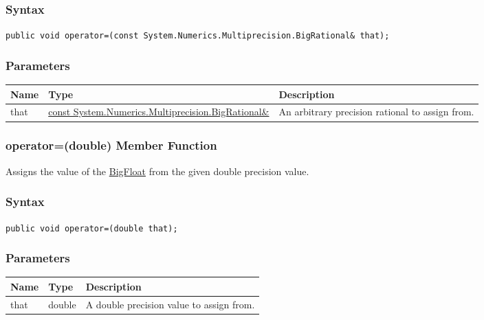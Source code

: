 \documentclass[a4paper,oneside,11.000000pt]{book}
\begin{document}
\subsubsection*{Syntax}
\texttt{public void operator=(const System.Numerics.Multiprecision.BigRational\& that);}
\subsubsection*{Parameters}
\begin{flushleft}
\begin{supertabular}[l]{!{\raggedright}p{1.30721cm}!{\raggedright}p{8.55945cm}!{\raggedright}p{4.93333cm}}
\textbf{Name}
& \textbf{Type}
& \textbf{Description}
\\
\hline
that
& \hyperlink{System.Numerics.Multiprecision.BigRational}{const System.\-Numerics.\-Multiprecision.\-BigRational\&\-}
& An arbitrary precision rational to assign from.

\\
\end{supertabular}

\end{flushleft}
\clearpage

\hypertarget{System.Numerics.Multiprecision.BigFloat.operator.assign.P.System.Numerics.Multiprecision.BigFloat.double}{\subsubsection*{operator=(double) Member Function}}
\begin{flushleft}
Assigns the value of the \hyperlink{System.Numerics.Multiprecision.BigFloat}{BigFloat} from the given double precision value.

\end{flushleft}
\subsubsection*{Syntax}\texttt{public void operator=(double that);}

\subsubsection*{Parameters}
\begin{flushleft}
\begin{supertabular}[l]{lll}
\textbf{Name}
& \textbf{Type}
& \textbf{Description}
\\
\hline
that
& double
& A double precision value to assign from.

\\
\end{supertabular}

\end{flushleft}
\clearpage
\end{document}
